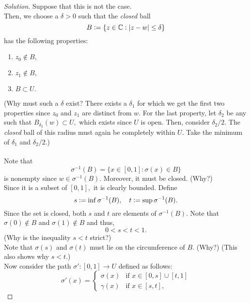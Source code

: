 \documentclass[12pt]{article}
\theoremstyle{definition}
\numberwithin{thm}{section}
\newenvironment{soln}{\begin{proof}[Solution]}{\end{proof}}
\begin{document}
\begin{enumerate}
\begin{soln}
		Suppose that this is not the case.\\
		Then, we choose a $\delta > 0$ such that the \emph{closed} ball
		\begin{equation*} 
			B \vcentcolon= \{z \in \mathbb{C} : |z - w| \le \delta\}
		\end{equation*}
		has the following properties:
		\begin{enumerate}
			\item $z_0 \notin B,$
			\item $z_1 \notin B,$
			\item $B \subset U.$
		\end{enumerate}
		(Why must such a $\delta$ exist? There exists a $\delta_1$ for which we get the first two properties since $z_0$ and $z_1$ are distinct from $w.$ For the last property, let $\delta_2$ be any such that $B_{\delta_2}(w) \subset U,$ which exists since $U$ is open. Then, consider $\delta_2/2.$ The \emph{closed} ball of this radius must again be completely within $U.$ Take the minimum of $\delta_1$ and $\delta_2/2$.)\\~\\
		Note that
		\begin{equation*} 
			\sigma^{-1}(B) = \{x \in [0, 1] : \sigma(x) \in B\}
		\end{equation*}
		is nonempty since $w \in \sigma^{-1}(B).$ Moreover, it must be closed. (Why?)\\
		Since it is a subset of $[0, 1],$ it is clearly bounded. Define
		\begin{equation*} 
			s \vcentcolon= \inf \sigma^{-1}(B), \quad t \vcentcolon= \sup\sigma^{-1}(B).
		\end{equation*}
		Since the set is closed, both $s$ and $t$ are elements of $\sigma^{-1}(B).$ Note that $\sigma(0) \notin B$ and $\sigma(1) \notin B$ and thus,
		\begin{equation*} 
			0 < s < t < 1.
		\end{equation*}
		(Why is the inequality $s < t$ strict?)\\
		Note that $\sigma(s)$ and $\sigma(t)$ must lie on the circumference of $B.$ (Why?) (This also shows why $s < t.$)\\
		Now consider the path $\sigma':[0, 1] \to U$ defined as follows:
		\begin{equation*} 
			\sigma'(x) = \begin{cases}
				\sigma(x) & \text{if } x \in [0, s] \cup [t, 1]\\
				\gamma(x) & \text{if } x \in [s, t],

\end{cases}
\end{equation*}
\end{soln}
\end{enumerate}
\end{document}
